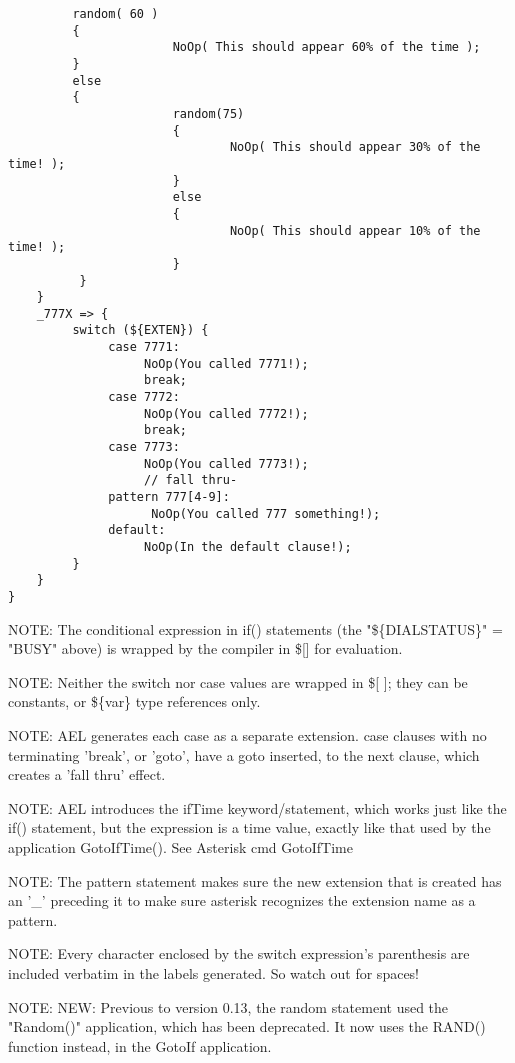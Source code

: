{\begin{astlisting}
\begin{verbatim}
         random( 60 )
         {
                       NoOp( This should appear 60% of the time );
         }
         else
         {
                       random(75)
                       {
                               NoOp( This should appear 30% of the time! );
                       }
                       else
                       {
                               NoOp( This should appear 10% of the time! );
                       }
          }
    }
    _777X => {
         switch (${EXTEN}) {
              case 7771:
                   NoOp(You called 7771!);
                   break;
              case 7772:
                   NoOp(You called 7772!);
                   break;
              case 7773:
                   NoOp(You called 7773!);
                   // fall thru-
              pattern 777[4-9]:
                    NoOp(You called 777 something!);
              default:
                   NoOp(In the default clause!);
         }
    }
}
\end{verbatim}
\end{astlisting}

NOTE: The conditional expression in if() statements (the
      "\$\{DIALSTATUS\}" = "BUSY" above) is wrapped by the compiler in
      \$[] for evaluation.

NOTE: Neither the switch nor case values are wrapped in \$[ ]; they can
      be constants, or \$\{var\} type references only.

NOTE: AEL generates each case as a separate extension. case clauses
      with no terminating 'break', or 'goto', have a goto inserted, to
      the next clause, which creates a 'fall thru' effect.

NOTE: AEL introduces the ifTime keyword/statement, which works just
      like the if() statement, but the expression is a time value,
      exactly like that used by the application GotoIfTime(). See
      Asterisk cmd GotoIfTime

NOTE: The pattern statement makes sure the new extension that is
      created has an '\_' preceding it to make sure asterisk recognizes
      the extension name as a pattern.

NOTE: Every character enclosed by the switch expression's parenthesis
      are included verbatim in the labels generated. So watch out for
      spaces!

NOTE: NEW: Previous to version 0.13, the random statement used the
      "Random()" application, which has been deprecated. It now uses
      the RAND() function instead, in the GotoIf application.


}
